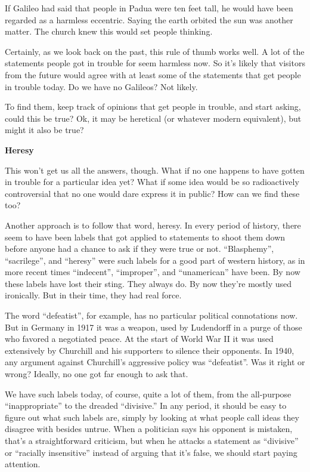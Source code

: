 \documentclass[12pt]{book}
\begin{document}
If Galileo had said that people in Padua were ten feet tall, he would
have been regarded as a harmless eccentric. Saying the earth orbited the
sun was another matter. The church knew this would set people thinking.

Certainly, as we look back on the past, this rule of thumb works well. A
lot of the statements people got in trouble for seem harmless now. So
it's likely that visitors from the future would agree with at least some
of the statements that get people in trouble today. Do we have no
Galileos? Not likely.

To find them, keep track of opinions that get people in trouble, and
start asking, could this be true? Ok, it may be heretical (or whatever
modern equivalent), but might it also be true?

\textbf{Heresy}

This won't get us all the answers, though. What if no one happens to
have gotten in trouble for a particular idea yet? What if some idea
would be so radioactively controversial that no one would dare express
it in public? How can we find these too?

Another approach is to follow that word, heresy. In every period of
history, there seem to have been labels that got applied to statements
to shoot them down before anyone had a chance to ask if they were true
or not. ``Blasphemy'', ``sacrilege'', and ``heresy'' were such labels
for a good part of western history, as in more recent times
``indecent'', ``improper'', and ``unamerican'' have been. By now these
labels have lost their sting. They always do. By now they're mostly used
ironically. But in their time, they had real force.

The word ``defeatist'', for example, has no particular political
connotations now. But in Germany in 1917 it was a weapon, used by
Ludendorff in a purge of those who favored a negotiated peace. At the
start of World War II it was used extensively by Churchill and his
supporters to silence their opponents. In 1940, any argument against
Churchill's aggressive policy was ``defeatist''. Was it right or wrong?
Ideally, no one got far enough to ask that.

We have such labels today, of course, quite a lot of them, from the
all-purpose ``inappropriate'' to the dreaded ``divisive.'' In any
period, it should be easy to figure out what such labels are, simply by
looking at what people call ideas they disagree with besides untrue.
When a politician says his opponent is mistaken, that's a
straightforward criticism, but when he attacks a statement as
``divisive'' or ``racially insensitive'' instead of arguing that it's
false, we should start paying attention.
\end{document}
